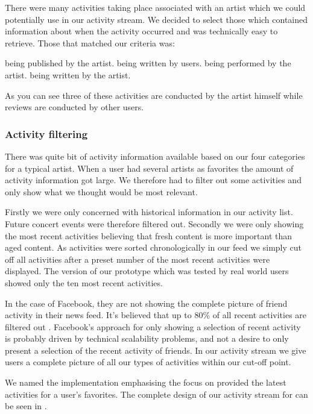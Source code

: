 There were many activities taking place associated with an artist
which we could potentially use in our activity stream. We decided to select
those which contained information about when the activity occurred and was
technically easy%
to retrieve. Those that matched our criteria was:

\begin{items}
   being published by the artist.
   being written by users.
   being performed by the artist.
   being written by the artist.
\end{items}

As you can see three of these activities are conducted by the artist himself
while reviews are conducted by other users.

\subsubsection{Activity filtering}

There was quite bit of activity information available based on our four
categories for a typical artist. When a user had several artists as
favorites the amount of activity information got large. We therefore had
to filter out some activities and only show what we thought would be most
relevant.

Firstly we were only concerned with historical information in our activity
list. Future concert events were therefore filtered out. Secondly we were only
showing
the most recent activities believing that fresh content is more important than
aged content. As activities were sorted chronologically in our feed we simply
cut off all activities after a preset number of the most recent activities
were displayed. The version of our prototype which was tested by real world
users showed only the ten most recent activities.

In the case of Facebook,
they are not showing the complete picture of friend activity in their news
feed. It's believed that up to 80\% of all recent activities are filtered
out \citep{elliott08}.
Facebook's approach for only showing a selection of recent activity is
probably driven by technical scalability problems, and not a desire to only
present a selection of the recent activity of friends. In our activity stream
we give users a complete picture of all our types of activities within our
cut-off point.

We named the implementation
\latest{}\dash{}emphasising the focus on provided the latest activities
for a user's favorites.
The complete design of our activity stream for \urort{} can be seen in
.

